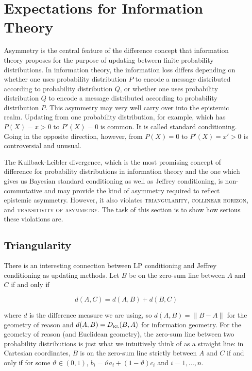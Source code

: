 \documentclass[12pt]{article}
\begin{document}
\section{Expectations for Information Theory}
\label{sec:expinfth}

Asymmetry is the central feature of the difference concept that
information theory proposes for the purpose of updating between finite
probability distributions. In information theory, the information loss
differs depending on whether one uses probability distribution $P$ to
encode a message distributed according to probability distribution
$Q$, or whether one uses probability distribution $Q$ to encode a
message distributed according to probability distribution $P$. This
asymmetry may very well carry over into the epistemic realm. Updating
from one probability distribution, for example, which has $P(X)=x>0$
to $P'(X)=0$ is common. It is called standard conditioning. Going in
the opposite direction, however, from $P(X)=0$ to $P'(X)=x'>0$ is
controversial and unusual.

The Kullback-Leibler divergence, which is the most promising concept
of difference for probability distributions in information theory and
the one which gives us Bayesian standard conditioning as well as
Jeffrey conditioning, is non-commutative and may provide the kind of
asymmetry required to reflect epistemic asymmetry. However, it also
violates \textsc{triangularity}, \textsc{collinear horizon}, and
\textsc{transitivity of asymmetry}. The task of this section is to
show how serious these violations are.

\subsection{Triangularity}
\label{subsec:triangularity}

There is an interesting connection between LP conditioning and Jeffrey
conditioning as updating methods. Let $B$ be on the zero-sum line
between $A$ and $C$ if and only if

\begin{equation}
\label{eq:jooziphu}
d(A,C)=d(A,B)+d(B,C)
\end{equation}

where $d$ is the difference measure we are using, so $d(A,B)=\|B-A\|$
for the geometry of reason and $d(A,B)=D_{\mbox{\tiny KL}}(B,A)$ for
information geometry. For the geometry of reason (and Euclidean
geometry), the zero-sum line between two probability distributions is
just what we intuitively think of as a straight line: in Cartesian
coordinates, $B$ is on the zero-sum line strictly between $A$ and $C$
if and only if for some $\vartheta\in(0,1)$,
$b_{i}=\vartheta{}a_{i}+(1-\vartheta)c_{i}$ and $i=1,\ldots,n$.
\end{document}
